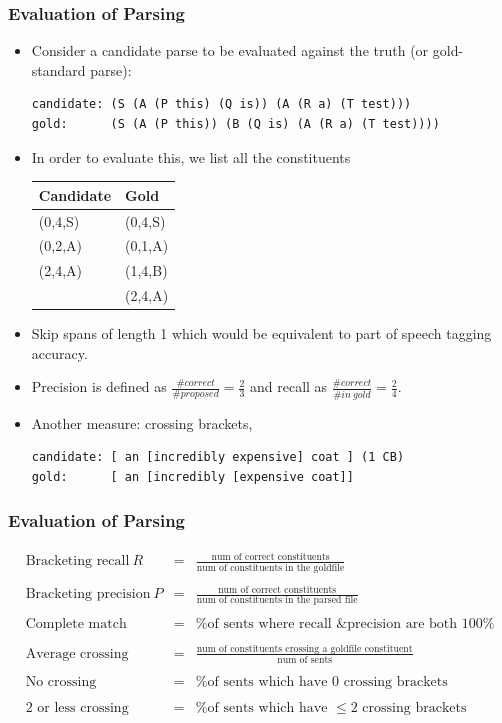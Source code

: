 \begin{frame}[fragile]
\frametitle{Evaluation of Parsing}
\begin{itemize}
\item Consider a candidate parse to be evaluated against the truth (or gold-standard parse):
{\footnotesize
\begin{verbatim}
candidate: (S (A (P this) (Q is)) (A (R a) (T test)))
gold:      (S (A (P this)) (B (Q is) (A (R a) (T test))))
\end{verbatim}
}
\item In order to evaluate this, we list all the constituents
{\small\begin{center}
\begin{tabular}{|l|l|}
\hline
Candidate & Gold \\
\hline
(0,4,S) & (0,4,S) \\
(0,2,A) & (0,1,A) \\
(2,4,A) & (1,4,B) \\
        & (2,4,A) \\
\hline
\end{tabular}
\end{center}
}
\item Skip spans of length 1 which would be equivalent to part of speech
tagging accuracy.
\item Precision is defined as $\frac{\#correct}{\#proposed} = \frac{2}{3}$
and recall as $\frac{\#correct}{\#in\ gold} = \frac{2}{4}$. 
\item Another measure: crossing brackets,
{\small\begin{verbatim}
candidate: [ an [incredibly expensive] coat ] (1 CB)
gold:      [ an [incredibly [expensive coat]]
\end{verbatim}
}
\end{itemize}
\end{frame}

\begin{frame}[fragile]
\frametitle{Evaluation of Parsing}
{\footnotesize
\[
\begin{array}{lcl}
\mbox{Bracketing recall}\ R & = & \frac{\mbox{num of correct constituents}}{\mbox{num of constituents in the goldfile}} \\
\\
\mbox{Bracketing precision}\ P & = & \frac{\mbox{num of correct constituents}}{\mbox{num of constituents in the parsed file}} \\
\\
\mbox{Complete match} & = & \mbox{\% of sents where recall \& precision are both 100\%} \\
\\
\mbox{Average crossing} & = & \frac{\mbox{num of constituents crossing a goldfile constituent}}{\mbox{num of sents}} \\
\\
\mbox{No crossing} & = & \mbox{\% of sents which have $0$ crossing brackets} \\
\\
\mbox{$2$ or less crossing} & = & \mbox{\% of sents which have $\leq 2$ crossing brackets}
\end{array}
\]
}
\end{frame}

